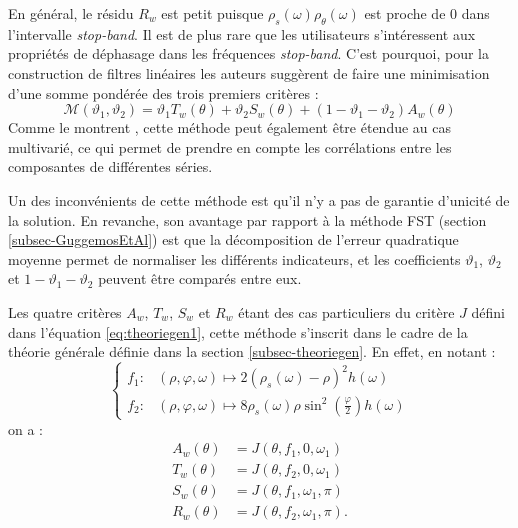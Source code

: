 \documentclass[
  11pt,
  french,
  a4paper]{article}
\newcommand\1{\mathds{1}}
\begin{document}
En général, le résidu \(R_w\) est petit puisque \(\rho_s(\omega)\rho_\theta(\omega)\) est proche de 0 dans l'intervalle \emph{stop-band}.
Il est de plus rare que les utilisateurs s'intéressent aux propriétés de déphasage dans les fréquences \emph{stop-band}.
C'est pourquoi, pour la construction de filtres linéaires les auteurs suggèrent de faire une minimisation d'une somme pondérée des trois premiers critères :
\[
\mathcal{M}(\vartheta_{1},\vartheta_{2})=\vartheta_{1}T_w(\theta)+\vartheta_{2}S_w(\theta)+(1-\vartheta_{1}-\vartheta_{2})A_w(\theta)
\]
Comme le montrent \textcite{tuckerwildi2020}, cette méthode peut également être étendue au cas multivarié, ce qui permet de prendre en compte les corrélations entre les composantes de différentes séries.

Un des inconvénients de cette méthode est qu'il n'y a pas de garantie d'unicité de la solution.
En revanche, son avantage par rapport à la méthode FST (section \ref{subsec-GuggemosEtAl}) est que la décomposition de l'erreur quadratique moyenne permet de normaliser les différents indicateurs, et les coefficients \(\vartheta_{1}\), \(\vartheta_{2}\) et \(1-\vartheta_{1}-\vartheta_{2}\) peuvent être comparés entre eux.

Les quatre critères \(A_w\), \(T_w\), \(S_w\) et \(R_w\) étant des cas particuliers du critère \(J\) défini dans l'équation \eqref{eq:theoriegen1}, cette méthode s'inscrit dans le cadre de la théorie générale définie dans la section \ref{subsec-theoriegen}.
En effet, en notant :
\[
\begin{cases}
    f_1\colon&(\rho,\varphi, \omega)\mapsto2\left(\rho_s(\omega)-\rho\right)^{2}h(\omega) \\
    f_2\colon&(\rho,\varphi, \omega)\mapsto8\rho_s(\omega)\rho\sin^{2}\left(\frac{\varphi}{2}\right)h(\omega)
\end{cases}
\]
on a :
\begin{align*}
A_w(\theta)&= J(\theta,f_1,0,\omega_1)\\
T_w(\theta)&= J(\theta,f_2,0,\omega_1)\\
S_w(\theta)&= J(\theta,f_1,\omega_1,\pi)\\
R_w(\theta)&= J(\theta,f_2,\omega_1,\pi).
\end{align*}
\end{document}
